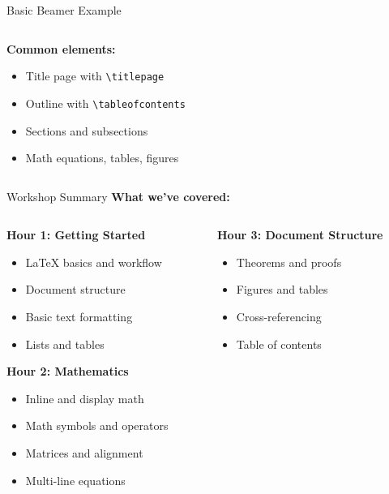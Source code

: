 \begin{frame}[fragile]{Basic Beamer Example}
\begin{columns}
\begin{column}{0.5\textwidth}
						\textbf{Common elements:}
						\begin{itemize}
							\item Title page with \texttt{\textbackslash titlepage}
							\item Outline with \texttt{\textbackslash tableofcontents}
							\item Sections and subsections
							\item Math equations, tables, figures
						\end{itemize}
						
						
					\end{column}
				\end{columns}
			\end{frame}
			
			\begin{frame}{Workshop Summary}
				\textbf{What we've covered:}
				\begin{columns}
					\begin{column}{0.5\textwidth}
						\textbf{Hour 1: Getting Started}
						\begin{itemize}
							\item LaTeX basics and workflow
							\item Document structure
							\item Basic text formatting
							\item Lists and tables
						\end{itemize}
						
						\textbf{Hour 2: Mathematics}
						\begin{itemize}
							\item Inline and display math
							\item Math symbols and operators
							\item Matrices and alignment
							\item Multi-line equations
						\end{itemize}
					\end{column}
					
					\begin{column}{0.5\textwidth}
						\textbf{Hour 3: Document Structure}
						\begin{itemize}
							\item Theorems and proofs
							\item Figures and tables
							\item Cross-referencing
							\item Table of contents
						\end{itemize}
						

\end{column}
\end{columns}
\end{frame}
